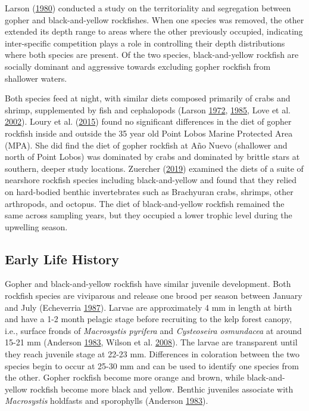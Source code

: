 \documentclass[12pt,]{article}
\begin{document}
Larson (\protect\hyperlink{ref-Larson1980}{1980}) conducted a study on
the territoriality and segregation between gopher and black-and-yellow
rockfishes. When one species was removed, the other extended its depth
range to areas where the other previously occupied, indicating
inter-specific competition plays a role in controlling their depth
distributions where both species are present. Of the two species,
black-and-yellow rockfish are socially dominant and aggressive towards
excluding gopher rockfish from shallower waters.

Both species feed at night, with similar diets composed primarily of
crabs and shrimp, supplemented by fish and cephalopods (Larson
\protect\hyperlink{ref-Larson1972}{1972},
\protect\hyperlink{ref-Hallacher1985}{1985}, Love et al.
\protect\hyperlink{ref-Love2002}{2002}). Loury et al.
(\protect\hyperlink{ref-Loury2015}{2015}) found no significant
differences in the diet of gopher rockfish inside and outside the 35
year old Point Lobos Marine Protected Area (MPA). She did find the diet
of gopher rockfish at Año Nuevo (shallower and north of Point Lobos) was
dominated by crabs and dominated by brittle stars at southern, deeper
study locations. Zuercher (\protect\hyperlink{ref-Zuercher2019}{2019})
examined the diets of a suite of nearshore rockfish species including
black-and-yellow and found that they relied on hard-bodied benthic
invertebrates such as Brachyuran crabs, shrimps, other arthropods, and
octopus. The diet of black-and-yellow rockfish remained the same across
sampling years, but they occupied a lower trophic level during the
upwelling season.

\subsection{Early Life History}\label{early-life-history}

Gopher and black-and-yellow rockfish have similar juvenile development.
Both rockfish species are viviparous and release one brood per season
between January and July (Echeverria
\protect\hyperlink{ref-Echeverria1987}{1987}). Larvae are approximately
4 mm in length at birth and have a 1-2 month pelagic stage before
recruiting to the kelp forest canopy, i.e., surface fronds of
\emph{Macrosystis pyrifera} and \emph{Cysteoseira osmundacea} at around
15-21 mm (Anderson \protect\hyperlink{ref-Anderson1983}{1983}, Wilson et
al. \protect\hyperlink{ref-Wilson2008}{2008}). The larvae are
transparent until they reach juvenile stage at 22-23 mm. Differences in
coloration between the two species begin to occur at 25-30 mm and can be
used to identify one species from the other. Gopher rockfish become more
orange and brown, while black-and-yellow rockfish become more black and
yellow. Benthic juveniles associate with \emph{Macrosystis} holdfasts
and sporophylls (Anderson \protect\hyperlink{ref-Anderson1983}{1983}).
\end{document}
